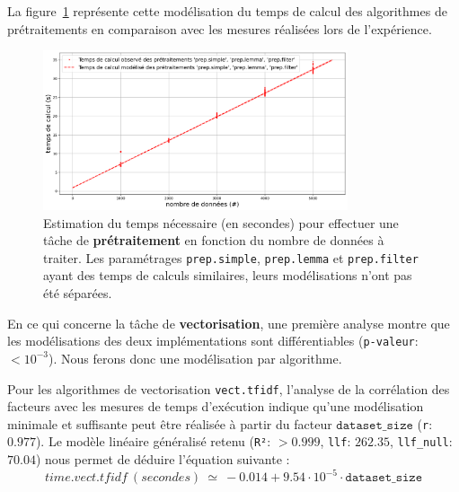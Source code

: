 			La figure~\ref{figure:4.3.2-ETUDE-COUTS-TEMPS-CALCUL-MODELISATION-PREPROCESSING} représente cette modélisation du temps de calcul des algorithmes de prétraitements en comparaison avec les mesures réalisées lors de l'expérience.
			\newline
			\begin{figure}[!htb]
				\centering
				\includegraphics[width=0.8\textwidth]{figures/etude-temps-calcul-modelisation-1prep}
				\caption{Estimation du temps nécessaire (en secondes) pour effectuer une tâche de \textbf{prétraitement} en fonction du nombre de données à traiter. Les paramétrages \texttt{prep.simple}, \texttt{prep.lemma} et \texttt{prep.filter} ayant des temps de calculs similaires, leurs modélisations n'ont pas été séparées.}
				\label{figure:4.3.2-ETUDE-COUTS-TEMPS-CALCUL-MODELISATION-PREPROCESSING}
			\end{figure}
			
			
			En ce qui concerne la tâche de \textbf{vectorisation}, une première analyse montre que les modélisations des deux implémentations sont différentiables  (\texttt{p-valeur}: $< 10^{-3}$). Nous ferons donc une modélisation par algorithme.
		
			Pour les algorithmes de vectorisation \texttt{vect.tfidf}, l'analyse de la corrélation des facteurs avec les mesures de temps d'exécution indique qu'une modélisation minimale et suffisante peut être réalisée à partir du facteur $\texttt{dataset\_size}$ (\texttt{r}: $0.977$).
			Le modèle linéaire généralisé retenu (\texttt{R²}: $> 0.999$, \texttt{llf}: $262.35$, \texttt{llf\_null}: $70.04$) nous permet de déduire l'équation suivante :
			\begin{equation}
				time.vect.tfidf~(secondes)~
				\simeq~-0.014 + 9.54 \cdot 10^{-5} \cdot \texttt{dataset\_size}
			\end{equation}
			
